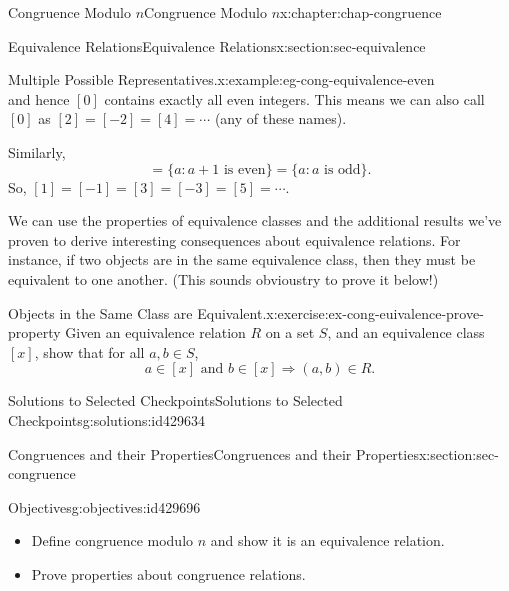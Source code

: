 \documentclass[oneside,10pt,]{book}
\numberwithin{equation}{section}
\begin{document}
\begin{chapterptx}{Congruence Modulo \(n\)}{}{Congruence Modulo \(n\)}{}{}{x:chapter:chap-congruence}
\begin{sectionptx}{Equivalence Relations}{}{Equivalence Relations}{}{}{x:section:sec-equivalence}
\begin{example}{Multiple Possible Representatives.}{x:example:eg-cong-equivalence-even}
\begin{equation*}
\end{equation*}
and hence \([0]\) contains exactly all even integers. This means we can also call \([0]\) as \([2] = [-2] = [4] = \cdots\) (any of these names).%
\par
Similarly,%
\begin{equation*}
[1] = \{a : a + 1 \text{ is even}\} = \{ a : a \text{ is odd}\}\text{.}
\end{equation*}
So, \([1] = [-1] = [3] = [-3] = [5] = \cdots\).%
\end{example}
We can use the properties of equivalence classes and the additional results we've proven to derive interesting consequences about equivalence relations. For instance, if two objects are in the same equivalence class, then they must be equivalent to one another. (This sounds obvious\textemdash{}try to prove it below!)%
\begin{inlineexercise}{Objects in the Same Class are Equivalent.}{x:exercise:ex-cong-euivalence-prove-property}%
Given an equivalence relation \(R\) on a set \(S\), and an equivalence class \([x]\), show that for all \(a, b \in S\),%
\begin{equation*}
a \in [x] \text{ and } b \in [x] \Rightarrow (a,b) \in R\text{.}
\end{equation*}
%
\end{inlineexercise}
%
%
\typeout{************************************************}
\typeout{************************************************}
%
\begin{solutions-subsection}{Solutions to Selected Checkpoints}{}{Solutions to Selected Checkpoints}{}{}{g:solutions:id429634}
\end{solutions-subsection}
\end{sectionptx}
%
%
\typeout{************************************************}
\typeout{************************************************}
%
\begin{sectionptx}{Congruences and their Properties}{}{Congruences and their Properties}{}{}{x:section:sec-congruence}
\begin{objectives}{Objectives}{g:objectives:id429696}
%
\begin{itemize}[label=\textbullet]
\item{}Define congruence modulo \(n\) and show it is an equivalence relation.%
\item{}Prove properties about congruence relations.%
\end{itemize}

\end{objectives}
\end{sectionptx}
\end{chapterptx}
\end{document}
